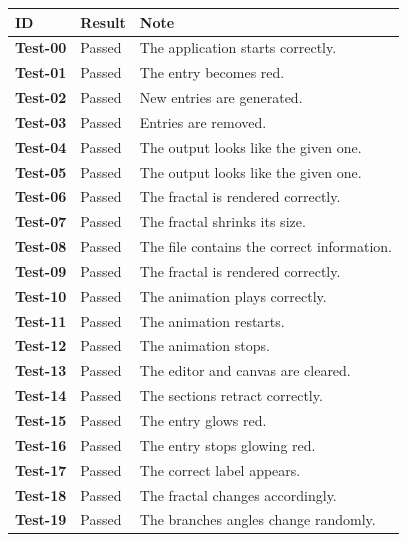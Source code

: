 \documentclass[a4paper]{article}
\begin{document}
\bgroup{}
\def\arraystretch{1.25}
\begin{center}
    \begin{tabular}{ |l|l|l| }
        \hline
        \textbf{ID} & \textbf{Result} & \textbf{Note} \\
        \hline
        \textbf{Test-00} & \color{darkgreen} Passed & The application starts correctly. \\
        \hline
        \textbf{Test-01} & \color{darkgreen} Passed & The entry becomes red. \\
        \hline
        \textbf{Test-02} & \color{darkgreen} Passed & New entries are generated. \\
        \hline
        \textbf{Test-03} & \color{darkgreen} Passed & Entries are removed. \\
        \hline
        \textbf{Test-04} & \color{darkgreen} Passed & The output looks like the given one. \\
        \hline
        \textbf{Test-05} & \color{darkgreen} Passed & The output looks like the given one. \\
        \hline
        \textbf{Test-06} & \color{darkgreen} Passed & The fractal is rendered correctly. \\
        \hline
        \textbf{Test-07} & \color{darkgreen} Passed & The fractal shrinks its size. \\
        \hline
        \textbf{Test-08} & \color{darkgreen} Passed & The file contains the correct information. \\
        \hline
        \textbf{Test-09} & \color{darkgreen} Passed & The fractal is rendered correctly. \\
        \hline
        \textbf{Test-10} & \color{darkgreen} Passed & The animation plays correctly. \\
        \hline
        \textbf{Test-11} & \color{darkgreen} Passed & The animation restarts. \\
        \hline
        \textbf{Test-12} & \color{darkgreen} Passed & The animation stops. \\
        \hline
        \textbf{Test-13} & \color{darkgreen} Passed & The editor and canvas are cleared. \\
        \hline
        \textbf{Test-14} & \color{darkgreen} Passed & The sections retract correctly. \\
        \hline
        \textbf{Test-15} & \color{darkgreen} Passed & The entry glows red. \\
        \hline
        \textbf{Test-16} & \color{darkgreen} Passed & The entry stops glowing red. \\
        \hline
        \textbf{Test-17} & \color{darkgreen} Passed & The correct label appears. \\
        \hline
        \textbf{Test-18} & \color{darkgreen} Passed & The fractal changes accordingly. \\
        \hline
        \textbf{Test-19} & \color{darkgreen} Passed & The branches angles change randomly. \\
        \hline
    \end{tabular}
\end{center}
\egroup{}
\end{document}
